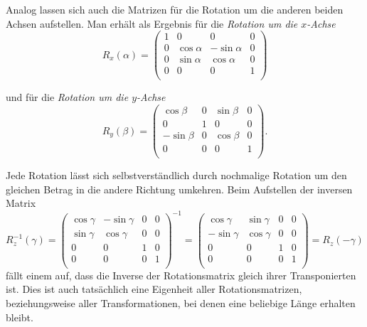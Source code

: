Analog lassen sich auch die Matrizen für die Rotation um die anderen beiden Achsen aufstellen. Man erhält als Ergebnis für die \emph{Rotation um die $x$-Achse}
\begin{equation}
 R_x{(\alpha)}
 = 
 \begin{pmatrix}
  1 & 0 & 0 & 0 \\
  0 & \cos \alpha & -\sin \alpha & 0 \\
  0 & \sin \alpha &  \cos \alpha & 0 \\
  0 & 0 & 0 & 1 \\
 \end{pmatrix}
\end{equation}

und für die \emph{Rotation um die $y$-Achse}
\begin{equation}
 R_y{(\beta)}
 = 
 \begin{pmatrix}
  \cos \beta & 0 & \sin \beta & 0 \\
  0 & 1 & 0 & 0 \\
  -\sin \beta & 0 & \cos \beta & 0 \\
  0 & 0 & 0 & 1 \\
 \end{pmatrix}.
\end{equation}

Jede Rotation lässt sich selbstverständlich durch nochmalige Rotation um den gleichen Betrag in die andere Richtung umkehren. Beim Aufstellen der inversen Matrix
\begin{equation}
 R_z^{-1}{(\gamma)}
 = 
 \begin{pmatrix}
  \cos \gamma & -\sin \gamma & 0 & 0 \\
  \sin \gamma &  \cos \gamma & 0 & 0 \\
  0 & 0 & 1 & 0 \\
  0 & 0 & 0 & 1 \\
 \end{pmatrix}^{-1}
 = 
 \begin{pmatrix}
   \cos \gamma & \sin \gamma & 0 & 0 \\
  -\sin \gamma & \cos \gamma & 0 & 0 \\
  0 & 0 & 1 & 0 \\
  0 & 0 & 0 & 1 \\
 \end{pmatrix}
 = R_z{(-\gamma)}
\end{equation}
fällt einem auf, dass die Inverse der Rotationsmatrix gleich ihrer Transponierten ist. Dies ist auch tatsächlich eine Eigenheit aller Rotationsmatrizen, beziehungsweise aller Transformationen, bei denen eine beliebige Länge erhalten bleibt.

